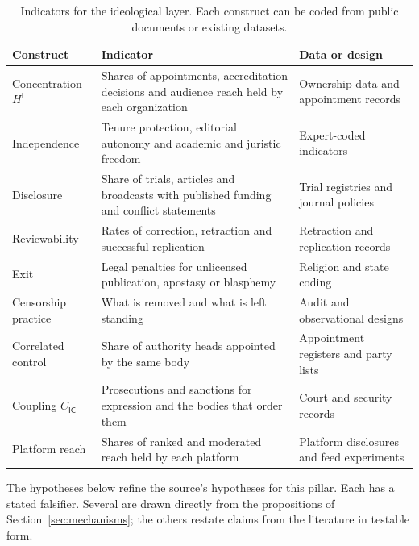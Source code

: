 \documentclass[11pt,letterpaper]{article}
\theoremstyle{definition}
\theoremstyle{remark}
\newcommand{\pI}{\mathsf{I}}
\newcommand{\pC}{\mathsf{C}}
\begin{document}
\begin{table}[t]
\centering
\small
\caption{Indicators for the ideological layer. Each construct can be coded from public documents or existing datasets.}
\label{tab:indicators}
\begin{tabularx}{\textwidth}{@{}L{3.1cm}YL{3.4cm}@{}}
\toprule
Construct & Indicator & Data or design \\
\midrule
Concentration $H^{\pI}$ & Shares of appointments, accreditation decisions and audience reach held by each organization & Ownership data \citep{djankov2003} and appointment records \\
Independence & Tenure protection, editorial autonomy and academic and juristic freedom & Expert-coded indicators \citep{coppedge2011} \\
Disclosure & Share of trials, articles and broadcasts with published funding and conflict statements & Trial registries and journal policies \\
Reviewability & Rates of correction, retraction and successful replication & Retraction and replication records \\
Exit & Legal penalties for unlicensed publication, apostasy or blasphemy & Religion and state coding \citep{fox2008} \\
Censorship practice & What is removed and what is left standing & Audit and observational designs \citep{king2013} \\
Correlated control & Share of authority heads appointed by the same body & Appointment registers and party lists \\
Coupling $C_{\pI\pC}$ & Prosecutions and sanctions for expression and the bodies that order them & Court and security records \\
Platform reach & Shares of ranked and moderated reach held by each platform & Platform disclosures and feed experiments \citep{guess2023} \\
\bottomrule
\end{tabularx}
\end{table}

The hypotheses below refine the source's hypotheses for this pillar. Each has a stated falsifier. Several are drawn directly from the propositions of Section~\ref{sec:mechanisms}; the others restate claims from the literature in testable form.
\end{document}
